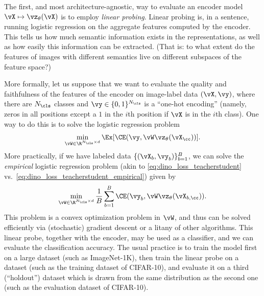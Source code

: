 \documentclass[../../book-main.tex]{subfiles}
\begin{document}
The first, and most architecture-agnostic, way to evaluate an encoder
model \(\vX \mapsto \vz_{\theta}(\vX)\) is to employ \textit{linear
probing}.
Linear probing is, in a sentence, running logistic
regression on the aggregate features computed by the encoder.
This
tells us how much semantic information exists in the representations,
as well as how easily this information can be extracted.
(That is: to
what extent do the features of images with different semantics live
on different subspaces of the feature space?)

More formally, let us suppose that we want to evaluate the quality
and faithfulness of the features of the encoder on image-label data
\((\vX, \vy)\), where there are \(N_{\cls}\) classes and \(\vy \in
\{0, 1\}^{N_{\cls}}\) is a ``one-hot encoding'' (namely, zeros in all
positions except a \(1\) in the \(i\)th position if \(\vX\) is in the
\(i\)th class).
One way to do this is to solve the logistic regression problem
\begin{equation}\label{eq:linear_probing}
\min_{\vW \in \R^{N_{\cls} \times d}}\Ex[\CE(\vy, \vW \vz_{\theta}(\vX_{\cc}))] .
\end{equation}
More practically, if we have labeled data \(\{(\vX_{b}, \vy_{b})\}_{b
= 1}^{B}\), we can solve the \textit{empirical} logistic regression
problem (akin to \eqref{eq:dino_loss_teacherstudent}
vs.~\eqref{eq:dino_loss_teacherstudent_empirical}) given by
\begin{equation}\label{eq:linear_probing_empirical}
\min_{\vW \in \R^{N_{\cls} \times d}}\frac{1}{B}\sum_{b =
1}^{B}\CE(\vy_{b}, \vW \vz_{\theta}(\vX_{b, \cc})) .
\end{equation}
This problem is a convex optimization problem in \(\vW\), and thus
can be solved efficiently via (stochastic) gradient descent or a
litany of other algorithms.
This linear probe, together with the
encoder, may be used as a classifier, and we can evaluate the
classification accuracy.
The usual practice is to train the model
first on a large dataset (such as ImageNet-1K), then train the linear
probe on a dataset (such as the training dataset of CIFAR-10), and
evaluate it on a third (``holdout'') dataset which is drawn from the
same distribution as the second one (such as the evaluation dataset
of CIFAR-10).
\end{document}
